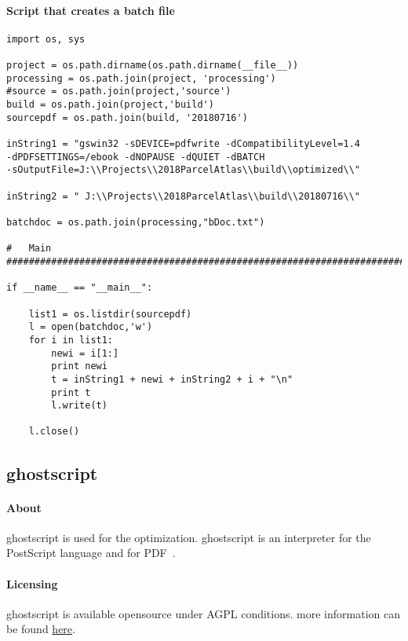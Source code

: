 \documentclass[class=article , crop=false, titlepage, twoside, multi={itemize, figure, verbatim}, float=false]{standalone}
\begin{document}
\paragraph{Script that creates a batch file}
\begin{verbatim}
import os, sys

project = os.path.dirname(os.path.dirname(__file__))
processing = os.path.join(project, 'processing')
#source = os.path.join(project,'source')
build = os.path.join(project,'build')
sourcepdf = os.path.join(build, '20180716')

inString1 = "gswin32 -sDEVICE=pdfwrite -dCompatibilityLevel=1.4 
-dPDFSETTINGS=/ebook -dNOPAUSE -dQUIET -dBATCH 
-sOutputFile=J:\\Projects\\2018ParcelAtlas\\build\\optimized\\"

inString2 = " J:\\Projects\\2018ParcelAtlas\\build\\20180716\\"

batchdoc = os.path.join(processing,"bDoc.txt")

#   Main
################################################################################

if __name__ == "__main__":

    list1 = os.listdir(sourcepdf)
    l = open(batchdoc,'w')
    for i in list1:
        newi = i[1:]
        print newi
        t = inString1 + newi + inString2 + i + "\n"
        print t
        l.write(t)

    l.close()

\end{verbatim}

\subsection{ghostscript}

\paragraph{About}
ghostscript is used for the optimization. ghostscript is an interpreter for the PostScript language and for PDF~\cite{ghostscript1}.
\paragraph{Licensing}
ghostscript is available opensource under AGPL conditions.  more information can be found \href{https://www.ghostscript.com/license.html}{here}.
\end{document}
